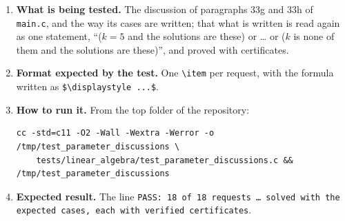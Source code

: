 \documentclass[11pt,a4paper]{article}
\begin{document}
\begin{enumerate}
\item \textbf{What is being tested.} The discussion of paragraphs 33g and 33h of \texttt{main.c}, and the way its cases are written; that what is written is read again as one statement, ``($k = 5$ and the solutions are these) or \dots{} or ($k$ is none of them and the solutions are these)'', and proved with certificates.

\item \textbf{Format expected by the test.} One \texttt{\textbackslash item} per request, with the formula written as \texttt{\$\textbackslash displaystyle ...\$}.

\item \textbf{How to run it.} From the top folder of the repository:
\begin{verbatim}
cc -std=c11 -O2 -Wall -Wextra -Werror -o /tmp/test_parameter_discussions \
    tests/linear_algebra/test_parameter_discussions.c && /tmp/test_parameter_discussions
\end{verbatim}

\item \textbf{Expected result.} The line \texttt{PASS: 18 of 18 requests \dots{} solved with the expected cases, each with verified certificates}.
\end{enumerate}
\end{document}
